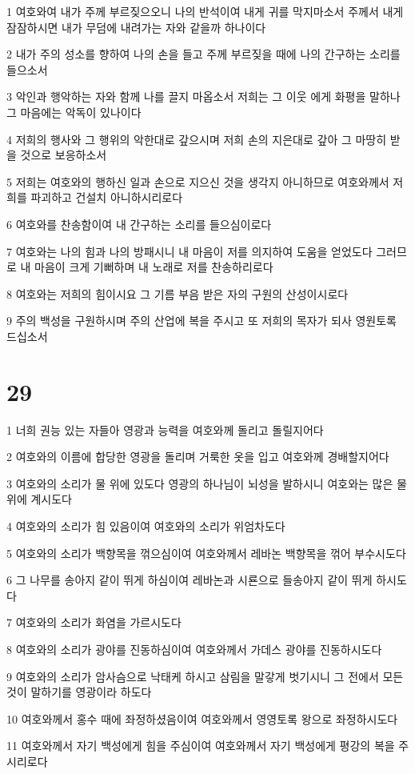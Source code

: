 \par 1 여호와여 내가 주께 부르짖으오니 나의 반석이여 내게 귀를 막지마소서 주께서 내게 잠잠하시면 내가 무덤에 내려가는 자와 같을까 하나이다
\par 2 내가 주의 성소를 향하여 나의 손을 들고 주께 부르짖을 때에 나의 간구하는 소리를 들으소서
\par 3 악인과 행악하는 자와 함께 나를 끌지 마옵소서 저희는 그 이웃 에게 화평을 말하나 그 마음에는 악독이 있나이다
\par 4 저희의 행사와 그 행위의 악한대로 갚으시며 저희 손의 지은대로 갚아 그 마땅히 받을 것으로 보응하소서
\par 5 저희는 여호와의 행하신 일과 손으로 지으신 것을 생각지 아니하므로 여호와께서 저희를 파괴하고 건설치 아니하시리로다
\par 6 여호와를 찬송함이여 내 간구하는 소리를 들으심이로다
\par 7 여호와는 나의 힘과 나의 방패시니 내 마음이 저를 의지하여 도움을 얻었도다 그러므로 내 마음이 크게 기뻐하며 내 노래로 저를 찬송하리로다
\par 8 여호와는 저희의 힘이시요 그 기름 부음 받은 자의 구원의 산성이시로다
\par 9 주의 백성을 구원하시며 주의 산업에 복을 주시고 또 저희의 목자가 되사 영원토록 드십소서

\chapter{29}

\par 1 너희 권능 있는 자들아 영광과 능력을 여호와께 돌리고 돌릴지어다
\par 2 여호와의 이름에 합당한 영광을 돌리며 거룩한 옷을 입고 여호와께 경배할지어다
\par 3 여호와의 소리가 물 위에 있도다 영광의 하나님이 뇌성을 발하시니 여호와는 많은 물 위에 계시도다
\par 4 여호와의 소리가 힘 있음이여 여호와의 소리가 위엄차도다
\par 5 여호와의 소리가 백향목을 꺾으심이여 여호와께서 레바논 백향목을 꺾어 부수시도다
\par 6 그 나무를 송아지 같이 뛰게 하심이여 레바논과 시룐으로 들송아지 같이 뛰게 하시도다
\par 7 여호와의 소리가 화염을 가르시도다
\par 8 여호와의 소리가 광야를 진동하심이여 여호와께서 가데스 광야를 진동하시도다
\par 9 여호와의 소리가 암사슴으로 낙태케 하시고 삼림을 말갛게 벗기시니 그 전에서 모든 것이 말하기를 영광이라 하도다
\par 10 여호와께서 홍수 때에 좌정하셨음이여 여호와께서 영영토록 왕으로 좌정하시도다
\par 11 여호와께서 자기 백성에게 힘을 주심이여 여호와께서 자기 백성에게 평강의 복을 주시리로다

